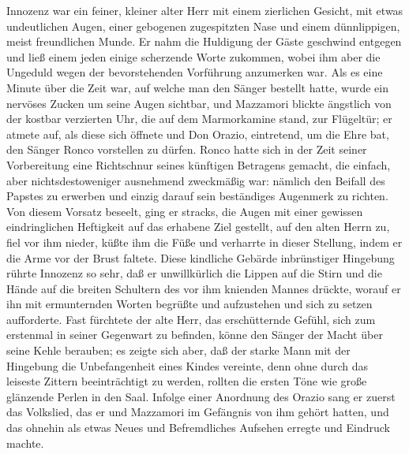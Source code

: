 Innozenz war ein feiner, kleiner alter Herr mit einem zierlichen
Gesicht, mit etwas undeutlichen Augen, einer gebogenen zugespitzten
Nase und einem dünnlippigen, meist freundlichen Munde. Er nahm die
Huldigung der Gäste geschwind entgegen und ließ einem jeden einige
scherzende Worte zukommen, wobei ihm aber die Ungeduld wegen der
bevorstehenden Vorführung anzumerken war. Als es eine
\pagenum{[84]} Minute über die Zeit war, auf welche man den Sänger
bestellt hatte, wurde ein nervöses Zucken um seine Augen sichtbar,
und Mazzamori blickte ängstlich von der kostbar verzierten Uhr, die
auf dem Marmorkamine stand, zur Flügeltür; er atmete auf, als diese
sich öffnete und Don Orazio, eintretend, um die Ehre bat, den
Sänger Ronco vorstellen zu dürfen. Ronco hatte sich in der Zeit
seiner Vorbereitung eine Richtschnur seines künftigen Betragens
gemacht, die einfach, aber nichtsdestoweniger ausnehmend zweckmäßig
war: nämlich den Beifall des Papstes zu erwerben und einzig darauf
sein beständiges Augenmerk zu richten. Von diesem Vorsatz beseelt,
ging er stracks, die Augen mit einer gewissen eindringlichen
Heftigkeit auf das erhabene Ziel gestellt, auf den alten Herrn zu,
fiel vor ihm nieder, küßte ihm die Füße und verharrte in dieser
Stellung, indem er die Arme vor der Brust faltete. Diese kindliche
Gebärde inbrünstiger Hingebung rührte Innozenz so sehr, daß er
unwillkürlich die Lippen auf die Stirn und die Hände auf die
breiten Schultern des vor ihm knienden Mannes drückte, worauf er
ihn mit ermunternden Worten begrüßte und aufzustehen und sich zu
setzen aufforderte. Fast fürchtete der alte Herr, das erschütternde
Gefühl, sich zum erstenmal in seiner Gegenwart zu befinden, könne
den Sänger der Macht über seine Kehle berauben; es zeigte sich
aber, daß der starke Mann mit der Hingebung die Unbefangenheit
eines Kindes vereinte, denn ohne durch das leiseste Zittern
beeinträchtigt zu werden, rollten die ersten Töne wie große
glänzende Perlen in den Saal. Infolge einer Anordnung des Orazio
sang er zuerst das Volkslied, das er und Mazzamori im Gefängnis von
ihm gehört hatten, und das ohnehin als etwas Neues und
Befremdliches Aufsehen erregte und Eindruck machte.

